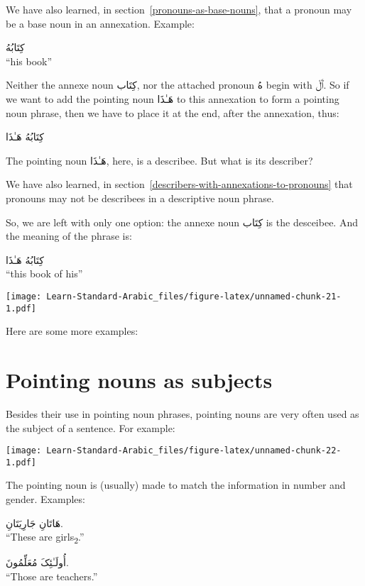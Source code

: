 \documentclass[
  10pt,
]{book}
\begin{document}
We have also learned, in
section~\ref{pronouns-as-base-nouns},
that a pronoun may be a base noun in an annexation.
Example:

\foreignlanguage{arabic}{کِتَابُهُ}\\
\enquote{his book}

Neither the annexe noun \foreignlanguage{arabic}{کِتَاب}, nor the attached pronoun \foreignlanguage{arabic}{هُ} begin with \foreignlanguage{arabic}{ٱَلْ}.
So if we want to add the pointing noun \foreignlanguage{arabic}{هَـٰذَا} to this annexation to form a pointing noun phrase,
then we have to place it at the end, after the annexation, thus:

\foreignlanguage{arabic}{کِتَابُهُ هَـٰذَا}

The pointing noun \foreignlanguage{arabic}{هَـٰذَا}, here, is a describee. But what is its describer?

We have also learned, in
section~\ref{describers-with-annexations-to-pronouns}
that pronouns may not be describees in a descriptive noun phrase.

So, we are left with only one option: the annexe noun \foreignlanguage{arabic}{کِتَاب} is the desceibee. And the meaning of the phrase is:

\foreignlanguage{arabic}{کِتَابُهُ هَـٰذَا}\\
\enquote{this book of his}

\texttt{[image: Learn-Standard-Arabic\_files/figure-latex/unnamed-chunk-21-1.pdf]}

Here are some more examples:

\section{Pointing nouns as subjects}\label{pointing-nouns-as-subjects}

Besides their use in pointing noun phrases, pointing nouns are very often used as the subject of a sentence. For example:

\texttt{[image: Learn-Standard-Arabic\_files/figure-latex/unnamed-chunk-22-1.pdf]}

The pointing noun is (usually) made to match the information in number and gender. Examples:

\foreignlanguage{arabic}{هَاتَانِ جَارِيَتَانِ.}\\
\enquote{These are girls\textsubscript{2}.}

\foreignlanguage{arabic}{أُولَـٰئِکَ مُعَلِّمُونَ.}\\
\enquote{Those are teachers.}
\end{document}
